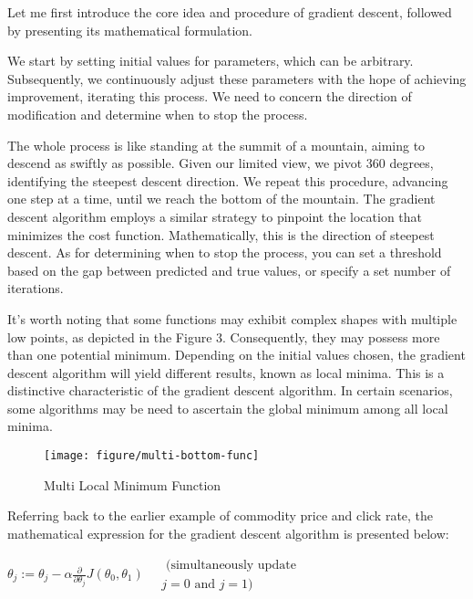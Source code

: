 \documentclass{article}
\begin{document}
Let me first introduce the core idea and procedure of gradient descent, followed by presenting its mathematical formulation.

We start by setting initial values for parameters, which can be arbitrary. Subsequently, we continuously adjust these parameters with the hope of achieving improvement, iterating this process. We need to concern the direction of modification and determine when to stop the process.

The whole process is like standing at the summit of a mountain, aiming to descend as swiftly as possible. Given our limited view, we pivot 360 degrees, identifying the steepest descent direction. We repeat this procedure, advancing one step at a time, until we reach the bottom of the mountain. The gradient descent algorithm employs a similar strategy to pinpoint the location that minimizes the cost function. Mathematically, this is the direction of steepest descent. As for determining when to stop the process, you can set a threshold based on the gap between predicted and true values, or specify a set number of iterations.

It's worth noting that some functions may exhibit complex shapes with multiple low points, as depicted in the Figure 3. Consequently, they may possess more than one potential minimum. Depending on the initial values chosen, the gradient descent algorithm will yield different results, known as local minima. This is a distinctive characteristic of the gradient descent algorithm. In certain scenarios, some algorithms may be need to ascertain the global minimum among all local minima.


    \begin{figure}[htbp]
        \centering
        \texttt{[image: figure/multi-bottom-func]}
        \caption{Multi Local Minimum Function}
     \end{figure}


    Referring back to the earlier example of commodity price and click rate, the mathematical expression for the gradient descent algorithm is presented below:

    \hspace*{\fill}

    $\theta_j:=\theta_j-\alpha \frac{\partial}{\partial \theta_j} J\left(\theta_0, \theta_1\right) \quad \begin{gathered}\text { (simultaneously update } \\ j=0 \text { and } j=1)\end{gathered}$
\end{document}
